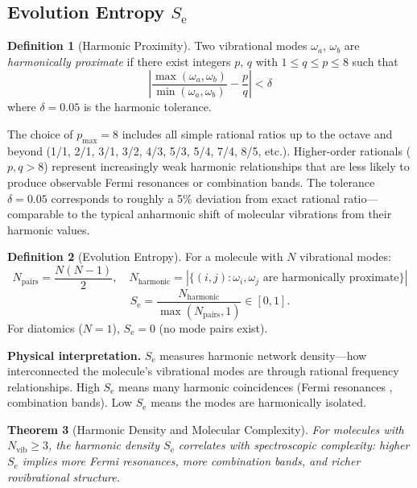 \documentclass[11pt,twocolumn,a4paper]{article}
\newtheorem{theorem}{Theorem}[section]
\theoremstyle{definition}
\newtheorem{definition}[theorem]{Definition}
\theoremstyle{remark}
\newcommand{\Se}{S_{\mathrm{e}}}
\newcommand{\Nvib}{N_{\mathrm{vib}}}
\begin{document}
\subsection{Evolution Entropy \texorpdfstring{$\Se$}{S\_e}}

\begin{definition}[Harmonic Proximity]
\label{def:harmonic}
Two vibrational modes $\omega_a$, $\omega_b$ are \emph{harmonically proximate} if there exist integers $p$, $q$ with $1 \leq q \leq p \leq 8$ such that
\begin{equation}
\left|\frac{\max(\omega_a, \omega_b)}{\min(\omega_a, \omega_b)} - \frac{p}{q}\right| < \delta
\label{eq:harmonic_proximity}
\end{equation}
where $\delta = 0.05$ is the harmonic tolerance.
\end{definition}

The choice of $p_{\max} = 8$ includes all simple rational ratios up to the octave and beyond (1/1, 2/1, 3/1, 3/2, 4/3, 5/3, 5/4, 7/4, 8/5, etc.). Higher-order rationals ($p, q > 8$) represent increasingly weak harmonic relationships that are less likely to produce observable Fermi resonances or combination bands. The tolerance $\delta = 0.05$ corresponds to roughly a 5\% deviation from exact rational ratio---comparable to the typical anharmonic shift of molecular vibrations from their harmonic values.

\begin{definition}[Evolution Entropy]
\label{def:s_e}
For a molecule with $N$ vibrational modes:
\begin{equation}
N_{\mathrm{pairs}} = \frac{N(N-1)}{2}, \quad
N_{\mathrm{harmonic}} = \left|\{(i,j) : \omega_i, \omega_j \text{ are harmonically proximate}\}\right|
\end{equation}
\begin{equation}
\Se = \frac{N_{\mathrm{harmonic}}}{\max(N_{\mathrm{pairs}}, 1)} \in [0, 1].
\label{eq:s_e}
\end{equation}
For diatomics ($N = 1$), $\Se = 0$ (no mode pairs exist).
\end{definition}

\textbf{Physical interpretation.} $\Se$ measures harmonic network density---how interconnected the molecule's vibrational modes are through rational frequency relationships. High $\Se$ means many harmonic coincidences (Fermi resonances \citep{fermi1931}, combination bands). Low $\Se$ means the modes are harmonically isolated.

\begin{theorem}[Harmonic Density and Molecular Complexity]
\label{thm:harmonic_complexity}
For molecules with $\Nvib \geq 3$, the harmonic density $\Se$ correlates with spectroscopic complexity: higher $\Se$ implies more Fermi resonances, more combination bands, and richer rovibrational structure.
\end{theorem}
\end{document}
